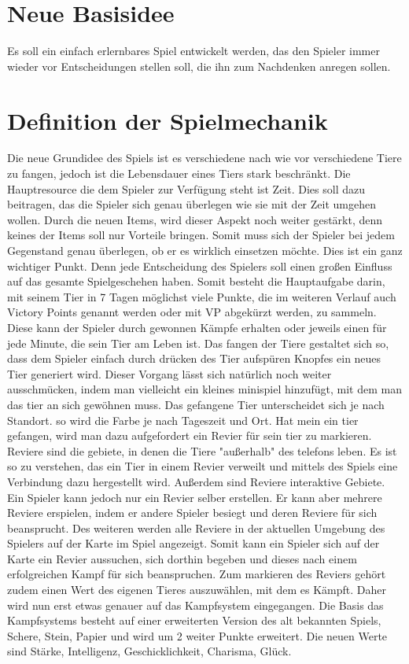 \section{Neue Basisidee} 
Es soll ein einfach erlernbares Spiel entwickelt werden, das den Spieler immer wieder vor Entscheidungen stellen soll, die ihn zum Nachdenken anregen sollen.


\section{Definition der Spielmechanik} 
Die neue Grundidee des Spiels ist es verschiedene nach wie vor verschiedene Tiere zu fangen, jedoch ist die Lebensdauer eines Tiers stark beschränkt. Die Hauptresource die dem Spieler zur Verfügung steht ist Zeit. Dies soll dazu beitragen, das die Spieler sich genau überlegen wie sie mit der Zeit umgehen wollen. Durch die neuen Items, wird dieser Aspekt noch weiter gestärkt, denn keines der Items soll nur Vorteile bringen. Somit muss sich der Spieler bei jedem Gegenstand genau überlegen, ob er es wirklich einsetzen möchte. Dies ist ein ganz wichtiger Punkt. Denn jede Entscheidung des Spielers soll einen großen Einfluss auf das gesamte Spielgeschehen haben. Somit besteht die Hauptaufgabe darin, mit seinem Tier in 7 Tagen möglichst viele Punkte, die im weiteren Verlauf auch Victory Points genannt werden oder mit VP abgekürzt werden, zu sammeln. Diese kann der Spieler durch gewonnen Kämpfe erhalten oder jeweils einen für jede Minute, die sein Tier am Leben ist. 
Das fangen der Tiere gestaltet sich so, dass dem Spieler einfach durch drücken des Tier aufspüren Knopfes ein neues Tier generiert wird. Dieser Vorgang lässt sich natürlich noch weiter ausschmücken, indem man vielleicht ein kleines minispiel hinzufügt, mit dem man das tier an sich gewöhnen muss. Das gefangene Tier unterscheidet sich je nach Standort. so wird die Farbe je nach Tageszeit und Ort. 
Hat mein ein tier gefangen, wird man dazu aufgefordert ein Revier für sein tier zu markieren. Reviere sind die gebiete, in denen die Tiere "außerhalb" des telefons leben. Es ist so zu verstehen, das ein Tier in einem Revier verweilt und mittels des Spiels eine Verbindung dazu hergestellt wird. Außerdem sind Reviere interaktive Gebiete. Ein Spieler kann jedoch nur ein Revier selber erstellen. Er kann aber mehrere Reviere erspielen, indem er andere Spieler besiegt und deren Reviere für sich beansprucht. Des weiteren werden alle Reviere in der aktuellen Umgebung des Spielers auf der Karte im Spiel angezeigt. Somit kann ein Spieler sich auf der Karte ein Revier aussuchen, sich dorthin begeben und dieses nach einem erfolgreichen Kampf für sich beanspruchen. Zum markieren des Reviers gehört zudem einen Wert des eigenen Tieres auszuwählen, mit dem es Kämpft. Daher wird nun erst etwas genauer auf das Kampfsystem eingegangen. Die Basis das Kampfsystems besteht auf einer erweiterten Version des alt bekannten Spiels, Schere, Stein, Papier und wird um 2 weiter Punkte erweitert. Die neuen Werte sind Stärke, Intelligenz, Geschicklichkeit, Charisma, Glück.



